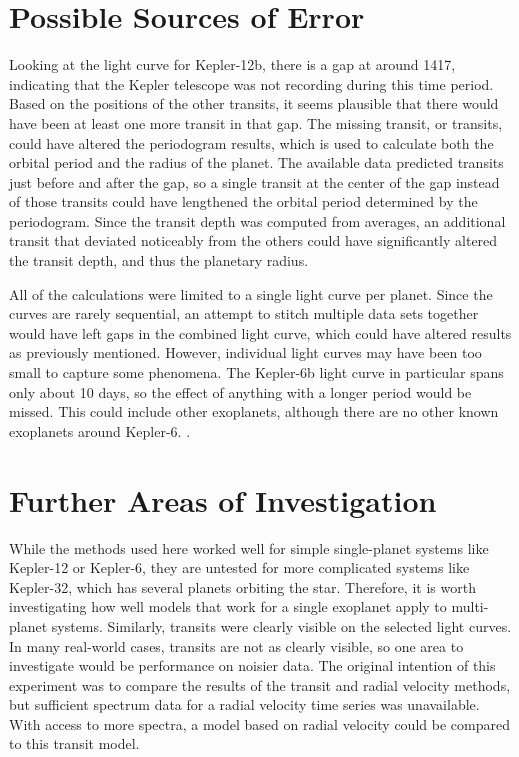 \section{Possible Sources of Error}

Looking at the light curve for Kepler-12b, there is a gap at around \SI{1417}{\bjd}, indicating that the Kepler telescope was not recording during
this time period. Based on the positions of the other transits, it seems plausible that there would have been at least one more transit in that gap.
The missing transit, or transits, could have altered the periodogram results, which is used to calculate both the orbital period and the radius
of the planet. The available data predicted transits just before and after the gap, so a single transit at the center of the gap instead of those
transits could have lengthened the orbital period determined by the periodogram. Since the transit depth was computed from averages, an additional transit
that deviated noticeably from the others could have significantly altered the transit depth, and thus the planetary radius.

All of the calculations were limited to a single light curve per planet. Since the curves are rarely sequential, an attempt to stitch multiple data
sets together would have left gaps in the combined light curve, which could have altered results as previously mentioned. However, individual light
curves may have been too small to capture some phenomena. The Kepler-6b light curve in particular spans only about 10 days, so the effect of anything
with a longer period would be missed. This could include other exoplanets, although there are no other known exoplanets around Kepler-6. \autocite{exoplanetEncyclopedia}.

\section{Further Areas of Investigation}

While the methods used here worked well for simple single-planet systems like Kepler-12 or Kepler-6, they are untested for more complicated systems
like Kepler-32, which has several planets orbiting the star. Therefore, it is worth investigating how well models that work for a single exoplanet
apply to multi-planet systems. Similarly, transits were clearly visible on the selected light curves. In many real-world cases, transits are not as
clearly visible, so one area to investigate would be performance on noisier data. The original intention of this experiment was to compare the results
of the transit and radial velocity methods, but sufficient spectrum data for a radial velocity time series was unavailable. With access to more spectra,
a model based on radial velocity could be compared to this transit model.
